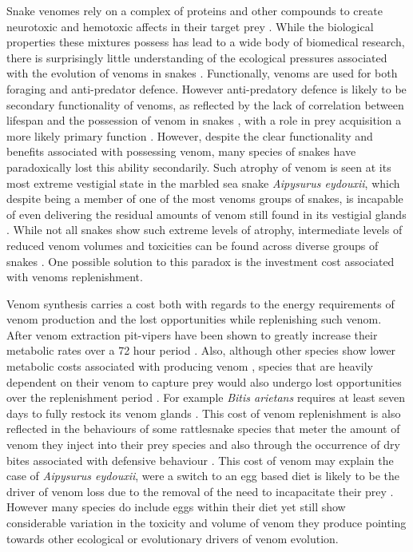 Snake venomes rely on a complex of proteins and other compounds to create neurotoxic and hemotoxic affects in their target prey \citep{greene1997snakes,casewell2013complex}. While the biological properties these mixtures possess has lead to a wide body of biomedical research, there is surprisingly little understanding of the ecological pressures associated with the evolution of venoms in snakes \citep{greene1997snakes,casewell2013complex}. Functionally, venoms are used for both foraging and anti-predator defence. However anti-predatory defence is likely to be secondary functionality of venoms, as reflected by the lack of correlation between lifespan and the possession of venom in snakes \citep{hossie2013species}, with a role in prey acquisition a more likely primary function \citep{casewell2013complex}. However, despite the clear functionality and benefits associated with possessing venom, many species of snakes have paradoxically lost this ability secondarily. Such atrophy of venom is seen at its most extreme vestigial state in the marbled sea snake \textit{Aipysurus eydouxii}, which despite being a member of one of the most venoms groups of snakes, is incapable of even delivering the residual amounts of venom still found in its vestigial glands \citep{li2005eggs}. While not all snakes show such extreme levels of atrophy, intermediate levels of reduced venom volumes and toxicities can be found across diverse groups of snakes \citep{fry2012structural}. One possible solution to this paradox is the investment cost associated with venoms replenishment.


Venom synthesis carries a cost both with regards to the energy requirements of venom production and the lost opportunities while replenishing such venom. After venom extraction pit-vipers have been shown to greatly increase their metabolic rates over a 72 hour period \cite{mccue2006cost}. Also, although other species show lower metabolic costs associated with producing venom \citep{pintor2010costs}, species that are heavily dependent on their venom to capture prey would also undergo lost opportunities over the replenishment period \citep{young2002snakes}. For example \textit{Bitis arietans} requires at least seven days to fully restock its venom glands \citep{currier2012unusual}. This cost of venom replenishment is also reflected in the behaviours of some rattlesnake species that meter the amount of venom they inject into their prey species \citep{hayes1995venom} and also through the occurrence of dry bites associated with defensive behaviour \citep{morgenstern2013venom}. This cost of venom may explain the case of \textit{Aipysurus eydouxii}, were a switch to an egg based diet is likely to be the driver of venom loss due to the removal of the need to incapacitate their prey \citep{li2005eggs}. However many species do include eggs within their diet \citep{de2006historical} yet still show considerable variation in the toxicity and volume of venom they produce pointing towards other ecological or evolutionary drivers of venom evolution.


